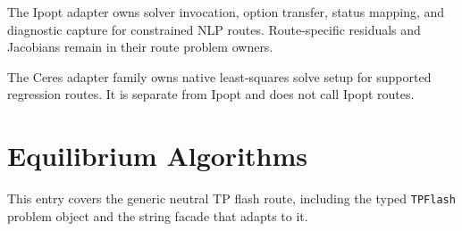 \documentclass[12pt, letterpaper]{article}
\begin{document}
The Ipopt adapter owns solver invocation, option transfer, status mapping, and
diagnostic capture for constrained NLP routes. Route-specific residuals and
Jacobians remain in their route problem owners.


The Ceres adapter family owns native least-squares solve setup for supported
regression routes. It is separate from Ipopt and does not call Ipopt routes.

\section{Equilibrium Algorithms}


This entry covers the generic neutral TP flash route, including the typed
\texttt{TPFlash} problem object and the string facade that adapts to it.

\end{document}
